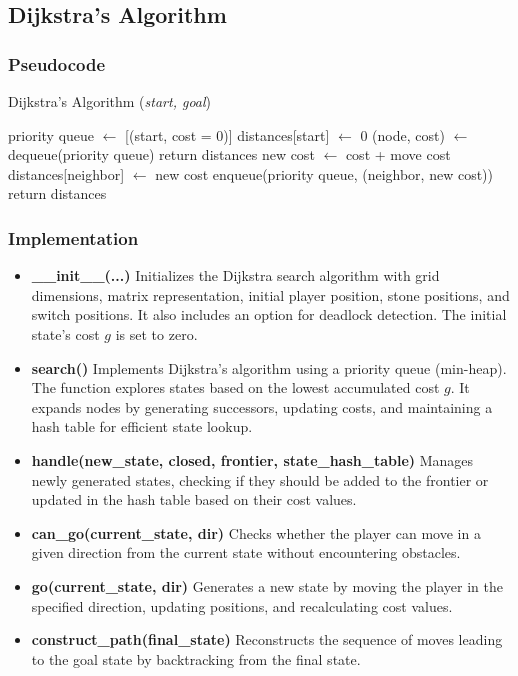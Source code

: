 \subsection{Dijkstra's Algorithm}

\subsubsection{Pseudocode}
\begin{algorithm}[H]
	\caption{Dijkstra's Algorithm (\textit{start, goal})}
	\label{alg:dijkstra}
	\begin{algorithmic}[1]
	\State priority queue \(\gets\) [(start, cost = 0)]
	\State distances[start] \(\gets\) 0
		\State (node, cost) \(\gets\) dequeue(priority queue)
			\State return distances
		\EndIf
			\State new cost \(\gets\) cost + move cost
				\State distances[neighbor] \(\gets\) new cost
				\State enqueue(priority queue, (neighbor, new cost))
			\EndIf
		\EndFor
	\EndWhile
	\State return distances
	\end{algorithmic}
\end{algorithm}

\subsubsection{Implementation}
\begin{itemize}
    \item \textbf{\_\_init\_\_(...)}  
    Initializes the Dijkstra search algorithm with grid dimensions, matrix representation, initial player position, stone positions, and switch positions. It also includes an option for deadlock detection. The initial state's cost \( g \) is set to zero.

    \item \textbf{search()}  
    Implements Dijkstra’s algorithm using a priority queue (min-heap). The function explores states based on the lowest accumulated cost \( g \). It expands nodes by generating successors, updating costs, and maintaining a hash table for efficient state lookup.

    \item \textbf{handle(new\_state, closed, frontier, state\_hash\_table)}  
    Manages newly generated states, checking if they should be added to the frontier or updated in the hash table based on their cost values.

    \item \textbf{can\_go(current\_state, dir)}  
    Checks whether the player can move in a given direction from the current state without encountering obstacles.

    \item \textbf{go(current\_state, dir)}  
    Generates a new state by moving the player in the specified direction, updating positions, and recalculating cost values.

    \item \textbf{construct\_path(final\_state)}  
    Reconstructs the sequence of moves leading to the goal state by backtracking from the final state.
\end{itemize}

